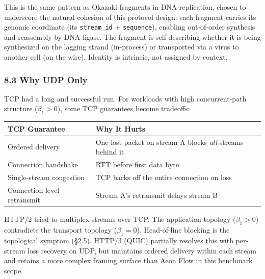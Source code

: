 \documentclass[
  11pt,
]{article}
\newcounter{none} %
\begin{document}
This is the same pattern as Okazaki fragments in DNA replication, chosen
to underscore the natural cohesion of this protocol design: each
fragment carries its genomic coordinate (its \texttt{stream\_id} +
\texttt{sequence}), enabling out-of-order synthesis and reassembly by
DNA ligase. The fragment is self-describing whether it is being
synthesized on the lagging strand (in-process) or transported via a
virus to another cell (on the wire). Identity is intrinsic, not assigned
by context.

\subsubsection{8.3 Why UDP Only}\label{why-udp-only}

TCP had a long and successful run. For workloads with high
concurrent-path structure (\(\beta_1 > 0\)), some TCP guarantees become
tradeoffs:

{\def\LTcaptype{none} %
\begin{longtable}[]{@{}
  >{\raggedright\arraybackslash}p{}
  >{\raggedright\arraybackslash}p{}@{}}
\toprule\noalign{}
\begin{minipage}[b]{\linewidth}\raggedright
TCP Guarantee
\end{minipage} & \begin{minipage}[b]{\linewidth}\raggedright
Why It Hurts
\end{minipage} \\
\midrule\noalign{}
\endhead
\bottomrule\noalign{}
\endlastfoot
Ordered delivery & One lost packet on stream A blocks \emph{all} streams
behind it \\
Connection handshake & 1 RTT before first data byte \\
Single-stream congestion & TCP backs off the entire connection on
loss \\
Connection-level retransmit & Stream A's retransmit delays stream B \\
\end{longtable}
}

HTTP/2 tried to multiplex streams over TCP. The application topology
(\(\beta_1 > 0\)) contradicts the transport topology (\(\beta_1 = 0\)).
Head-of-line blocking is the topological symptom (§2.5). HTTP/3 (QUIC)
partially resolves this with per-stream loss recovery on UDP, but
maintains ordered delivery within each stream and retains a more complex
framing surface than Aeon Flow in this benchmark scope.
\end{document}
